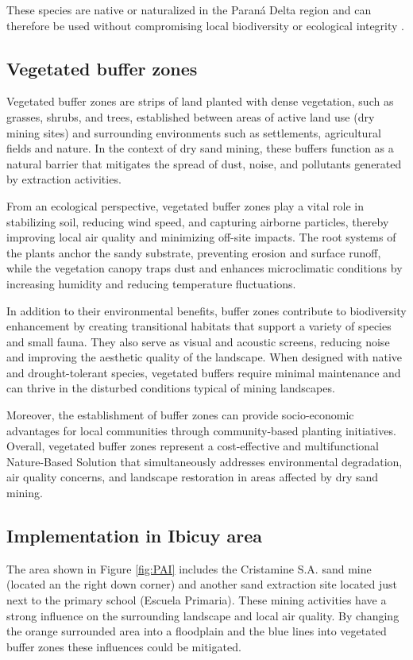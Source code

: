 These species are native or naturalized in the Paraná Delta region and can therefore be used without compromising local biodiversity or ecological integrity \autocite{m.eidPhytoremediationHeavyMetals2020}. 

\subsection{Vegetated buffer zones}
Vegetated buffer zones are strips of land planted with dense vegetation, such as grasses, shrubs, and trees, established between areas of active land use (dry mining sites) and surrounding environments such as settlements, agricultural fields and nature. In the context of dry sand mining, these buffers function as a natural barrier that mitigates the spread of dust, noise, and pollutants generated by extraction activities.

From an ecological perspective, vegetated buffer zones play a vital role in stabilizing soil, reducing wind speed, and capturing airborne particles, thereby improving local air quality and minimizing off-site impacts. The root systems of the plants anchor the sandy substrate, preventing erosion and surface runoff, while the vegetation canopy traps dust and enhances microclimatic conditions by increasing humidity and reducing temperature fluctuations.

In addition to their environmental benefits, buffer zones contribute to biodiversity enhancement by creating transitional habitats that support a variety of species and small fauna. They also serve as visual and acoustic screens, reducing noise and improving the aesthetic quality of the landscape. When designed with native and drought-tolerant species, vegetated buffers require minimal maintenance and can thrive in the disturbed conditions typical of mining landscapes.

Moreover, the establishment of buffer zones can provide socio-economic advantages for local communities through community-based planting initiatives. Overall, vegetated buffer zones represent a cost-effective and multifunctional Nature-Based Solution that simultaneously addresses environmental degradation, air quality concerns, and landscape restoration in areas affected by dry sand mining.

\subsection{Implementation in Ibicuy area}
The area shown in Figure \ref{fig:PAI} includes the Cristamine S.A. sand mine (located an the right down corner) and another sand extraction site located just next to the primary school (Escuela Primaria). These mining activities have a strong influence on the surrounding landscape and local air quality. By changing the orange surrounded area into a floodplain and the blue lines into vegetated buffer zones these influences could be mitigated. 

